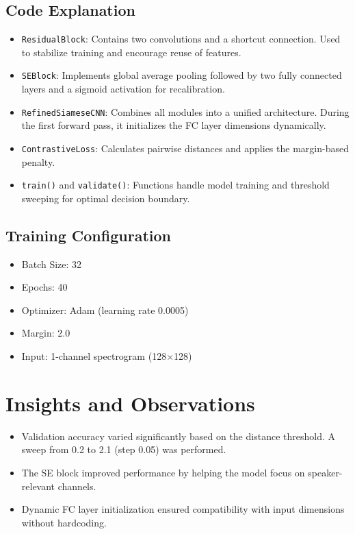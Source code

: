 \documentclass[12pt]{article}
\begin{document}
\subsection{Code Explanation}
\begin{itemize}
\item \texttt{ResidualBlock}: Contains two convolutions and a shortcut connection. Used to stabilize training and encourage reuse of features.
\item \texttt{SEBlock}: Implements global average pooling followed by two fully connected layers and a sigmoid activation for recalibration.
\item \texttt{RefinedSiameseCNN}: Combines all modules into a unified architecture. During the first forward pass, it initializes the FC layer dimensions dynamically.
\item \texttt{ContrastiveLoss}: Calculates pairwise distances and applies the margin-based penalty.
\item \texttt{train()} and \texttt{validate()}: Functions handle model training and threshold sweeping for optimal decision boundary.
\end{itemize}

\subsection{Training Configuration}
\begin{itemize}
\item Batch Size: 32
\item Epochs: 40
\item Optimizer: Adam (learning rate 0.0005)
\item Margin: 2.0
\item Input: 1-channel spectrogram (128$\times$128)
\end{itemize}

\section{Insights and Observations}
\begin{itemize}
\item Validation accuracy varied significantly based on the distance threshold. A sweep from 0.2 to 2.1 (step 0.05) was performed.
\item The SE block improved performance by helping the model focus on speaker-relevant channels.
\item Dynamic FC layer initialization ensured compatibility with input dimensions without hardcoding.
\end{itemize}
\end{document}
